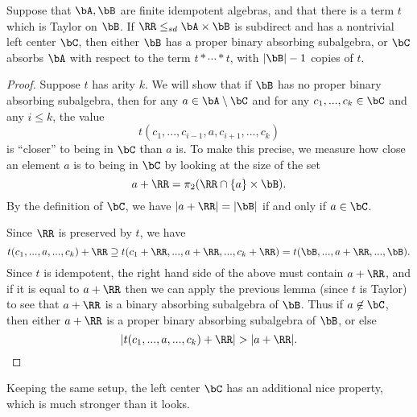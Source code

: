 \begin{thm} Suppose that $\bA, \bB$ are finite idempotent algebras, and that there is a term $t$ which is Taylor on $\bB$. If $\RR \le_{sd} \bA \times \bB$ is subdirect and has a nontrivial left center $\bC$, then either $\bB$ has a proper binary absorbing subalgebra, or $\bC$ absorbs $\bA$ with respect to the term $t*\cdots *t$, with $|\bB|-1$ copies of $t$.
\end{thm}
\begin{proof} Suppose $t$ has arity $k$. We will show that if $\bB$ has no proper binary absorbing subalgebra, then for any $a \in \bA \setminus \bC$ and for any $c_1, ..., c_k \in \bC$ and any $i \le k$, the value
\[
t(c_1, ..., c_{i-1}, a, c_{i+1}, ..., c_k)
\]
is ``closer'' to being in $\bC$ than $a$ is. To make this precise, we measure how close an element $a$ is to being in $\bC$ by looking at the size of the set
\[
a+\RR = \pi_2(\RR \cap \{a\}\times \bB).
\]
By the definition of $\bC$, we have $|a + \RR| = |\bB|$ if and only if $a \in \bC$.

Since $\RR$ is preserved by $t$, we have
\[
t(c_1, ..., a, ..., c_k) + \RR \supseteq t(c_1+\RR, ..., a+\RR, ..., c_k+\RR) = t(\bB, ..., a + \RR, ..., \bB).
\]
Since $t$ is idempotent, the right hand side of the above must contain $a+\RR$, and if it is equal to $a+\RR$ then we can apply the previous lemma (since $t$ is Taylor) to see that $a+\RR$ is a binary absorbing subalgebra of $\bB$. Thus if $a \not\in \bC$, then either $a + \RR$ is a proper binary absorbing subalgebra of $\bB$, or else
\[
|t(c_1, ..., a, ..., c_k) + \RR| > |a+\RR|.\qedhere
\]
\end{proof}

Keeping the same setup, the left center $\bC$ has an additional nice property, which is much stronger than it looks.

